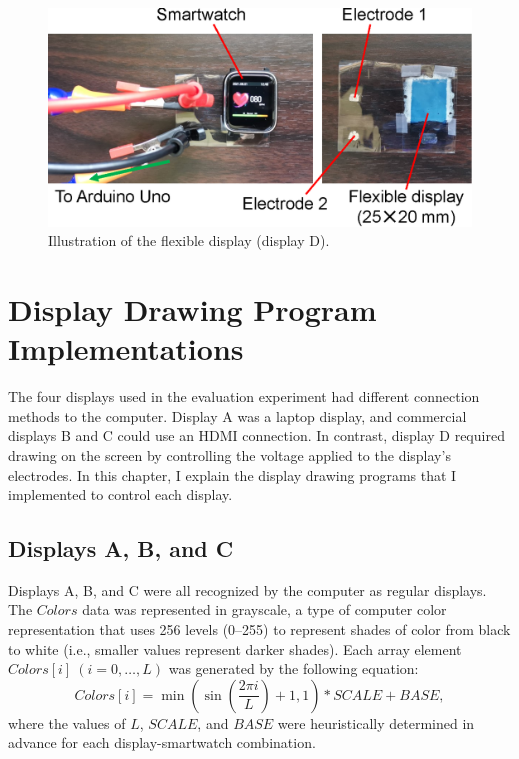 \begin{figure}[!t]
  \centering
  \includegraphics[width=1\linewidth]{figures/flexible.eps}
  \caption{Illustration of the flexible display (display D).}
  \label{fig:flexible}
\end{figure}


\section{Display Drawing Program Implementations}
The four displays used in the evaluation experiment had different connection methods to the computer. Display A was a laptop display, and commercial displays B and C could use an HDMI connection. In contrast, display D required drawing on the screen by controlling the voltage applied to the display's electrodes. In this chapter, I explain the display drawing programs that I implemented to control each display.

\subsection{Displays A, B, and C}
Displays A, B, and C were all recognized by the computer as regular displays. The $Colors$ data was represented in grayscale, a type of computer color representation that uses 256 levels (0--255) to represent shades of color from black to white (i.e., smaller values represent darker shades). Each array element $Colors[i]~(i=0,\dots,L)$ was generated by the following equation:
\begin{equation}
  Colors[i]=\min\left(\sin\left(\frac{2\pi i}{L}\right)+1,1\right)*SCALE+BASE,
\end{equation}
where the values of $L$, $SCALE$, and $BASE$ were heuristically determined in advance for each display-smartwatch combination.\par

